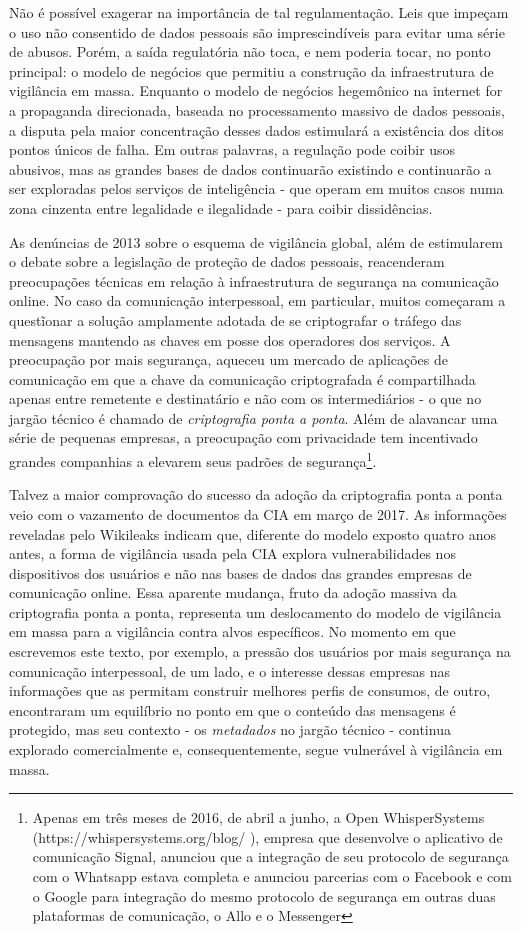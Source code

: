 Não é possível exagerar na importância de tal regulamentação. Leis que
impeçam o uso não consentido de dados pessoais são imprescindíveis para
evitar uma série de abusos. Porém, a saída regulatória não toca, e nem
poderia tocar, no ponto principal: o modelo de negócios que permitiu a
construção da infraestrutura de vigilância em massa. Enquanto o modelo
de negócios hegemônico na internet for a propaganda direcionada, baseada
no processamento massivo de dados pessoais, a disputa pela maior
concentração desses dados estimulará a existência dos ditos pontos
únicos de falha. Em outras palavras, a regulação pode coibir usos
abusivos, mas as grandes bases de dados continuarão existindo e
continuarão a ser exploradas pelos serviços de inteligência - que operam
em muitos casos numa zona cinzenta entre legalidade e ilegalidade - para
coibir dissidências.

As denúncias de 2013 sobre o esquema de vigilância global, além de
estimularem o debate sobre a legislação de proteção de dados pessoais,
reacenderam preocupações técnicas em relação à infraestrutura de
segurança na comunicação online. No caso da comunicação interpessoal, em
particular, muitos começaram a questĩonar a solução amplamente adotada
de se criptografar o tráfego das mensagens mantendo as chaves em posse
dos operadores dos serviços. A preocupação por mais segurança, aqueceu
um mercado de aplicações de comunicação em que a chave da comunicação
criptografada é compartilhada apenas entre remetente e destinatário e
não com os intermediários - o que no jargão técnico é chamado de
\emph{criptografia ponta a ponta}. Além de alavancar uma série de
pequenas empresas, a preocupação com privacidade tem incentivado grandes
companhias a elevarem seus padrões de segurança\footnote{Apenas
  em três meses de 2016, de abril a junho, a Open WhisperSystems
  (https://whispersystems.org/blog/ ), empresa que desenvolve o
  aplicativo de comunicação Signal, anunciou que a integração de seu
  protocolo de segurança com o Whatsapp estava completa e anunciou
  parcerias com o Facebook e com o Google para integração do mesmo
  protocolo de segurança em outras duas plataformas de comunicação, o
  Allo e o Messenger }.

Talvez a maior comprovação do sucesso da adoção da criptografia ponta a
ponta veio com o vazamento de documentos da CIA em março de 2017. As
informações reveladas pelo Wikileaks indicam que, diferente do modelo
exposto quatro anos antes, a forma de vigilância usada pela CIA explora
vulnerabilidades nos dispositivos dos usuários e não nas bases de dados
das grandes empresas de comunicação online. Essa aparente mudança, fruto
da adoção massiva da criptografia ponta a ponta, representa um
deslocamento do modelo de vigilância em massa para a vigilância contra
alvos específicos. No momento em que escrevemos este texto, por exemplo,
a pressão dos usuários por mais segurança na comunicação interpessoal,
de um lado, e o interesse dessas empresas nas informações que as
permitam construir melhores perfis de consumos, de outro, encontraram um
equilíbrio no ponto em que o conteúdo das mensagens é protegido, mas seu
contexto - os \emph{metadados} no jargão técnico - continua explorado
comercialmente e, consequentemente, segue vulnerável à vigilância em
massa.

